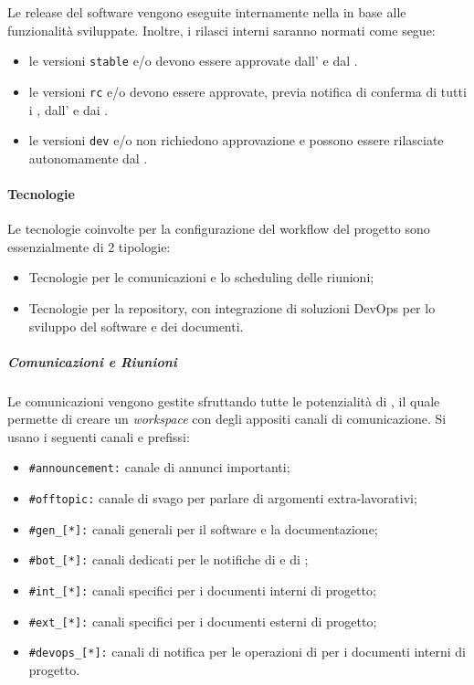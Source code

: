 		Le release del software vengono eseguite internamente nella  in base alle funzionalità sviluppate. Inoltre, i rilasci interni saranno normati come segue:
		\begin{itemize}
			\item le versioni \verb!stable! e/o  devono essere approvate dall' e dal .
			\item le versioni \verb!rc! e/o  devono essere approvate, previa notifica di conferma di tutti i , dall' e dai .
			\item le versioni \verb!dev! e/o  non richiedono approvazione e possono essere rilasciate autonomamente dal .
		\end{itemize}

	\paragraph{Tecnologie}

	Le tecnologie coinvolte per la configurazione del workflow del progetto sono essenzialmente di 2 tipologie:
	\begin{itemize}
		\item Tecnologie per le comunicazioni e lo scheduling delle riunioni;
		\item Tecnologie per la repository, con integrazione di soluzioni DevOps per lo sviluppo del software e dei documenti.
	\end{itemize}

		\subparagraph{Comunicazioni e Riunioni}

		Le comunicazioni vengono gestite sfruttando tutte le potenzialità di , il quale permette di creare un \textit{workspace} con degli appositi canali di comunicazione. Si usano i seguenti canali e prefissi:
		\begin{itemize}
			\item \verb!#announcement:! canale di annunci importanti;
			\item \verb!#offtopic:! canale di svago per parlare di argomenti extra-lavorativi;
			\item \verb!#gen_[*]:! canali generali per il software e la documentazione;
			\item \verb!#bot_[*]:! canali dedicati per le notifiche di  e di ;
			\item \verb!#int_[*]:! canali specifici per i documenti interni di progetto;
			\item \verb!#ext_[*]:! canali specifici per i documenti esterni di progetto;
			\item \verb!#devops_[*]:! canali di notifica per le operazioni di  per i documenti interni di progetto.
		\end{itemize}

